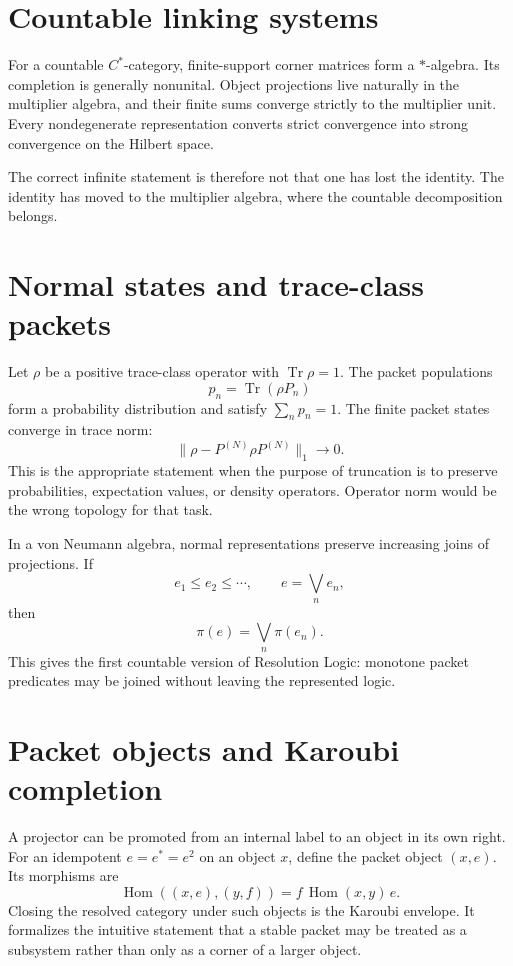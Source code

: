 \documentclass[11pt,oneside]{book}
\theoremstyle{remark}
\begin{document}
\section{Countable linking systems}
For a countable \(C^*\)-category, finite-support corner matrices form a \(*\)-algebra.  Its completion is generally nonunital.  Object projections live naturally in the multiplier algebra, and their finite sums converge strictly to the multiplier unit.  Every nondegenerate representation converts strict convergence into strong convergence on the Hilbert space.

The correct infinite statement is therefore not that one has lost the identity.  The identity has moved to the multiplier algebra, where the countable decomposition belongs.

\section{Normal states and trace-class packets}
Let \(\rho\) be a positive trace-class operator with \(\operatorname{Tr}\rho=1\).  The packet populations
\[
p_n=\operatorname{Tr}(\rho P_n)
\]
form a probability distribution and satisfy \(\sum_np_n=1\).  The finite packet states converge in trace norm:
\[
\|\rho-P^{(N)}\rho P^{(N)}\|_1\to0.
\]
This is the appropriate statement when the purpose of truncation is to preserve probabilities, expectation values, or density operators.  Operator norm would be the wrong topology for that task.

In a von Neumann algebra, normal representations preserve increasing joins of projections.  If
\[
e_1\le e_2\le\cdots,
\qquad
e=\bigvee_ne_n,
\]
then
\[
\pi(e)=\bigvee_n\pi(e_n).
\]
This gives the first countable version of Resolution Logic: monotone packet predicates may be joined without leaving the represented logic.

\section{Packet objects and Karoubi completion}
A projector can be promoted from an internal label to an object in its own right.  For an idempotent \(e=e^*=e^2\) on an object \(x\), define the packet object \((x,e)\).  Its morphisms are
\[
\operatorname{Hom}((x,e),(y,f))
=f\,\operatorname{Hom}(x,y)\,e.
\]
Closing the resolved category under such objects is the Karoubi envelope.  It formalizes the intuitive statement that a stable packet may be treated as a subsystem rather than only as a corner of a larger object.
\end{document}
